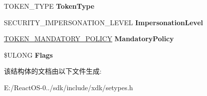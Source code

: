\begin{DoxyCompactItemize}
T\+O\+K\+E\+N\+\_\+\+T\+Y\+PE {\bfseries Token\+Type}
\item 
\mbox{\label{struct___t_o_k_e_n___a_c_c_e_s_s___i_n_f_o_r_m_a_t_i_o_n_a9536f8b6211074617a35fc08c63d5390}} 
S\+E\+C\+U\+R\+I\+T\+Y\+\_\+\+I\+M\+P\+E\+R\+S\+O\+N\+A\+T\+I\+O\+N\+\_\+\+L\+E\+V\+EL {\bfseries Impersonation\+Level}
\item 
\mbox{\label{struct___t_o_k_e_n___a_c_c_e_s_s___i_n_f_o_r_m_a_t_i_o_n_affb4c746ae83a85f5f29cc34a5e4c863}} 
\hyperlink{struct___t_o_k_e_n___m_a_n_d_a_t_o_r_y___p_o_l_i_c_y}{T\+O\+K\+E\+N\+\_\+\+M\+A\+N\+D\+A\+T\+O\+R\+Y\+\_\+\+P\+O\+L\+I\+CY} {\bfseries Mandatory\+Policy}
\item 
\mbox{\label{struct___t_o_k_e_n___a_c_c_e_s_s___i_n_f_o_r_m_a_t_i_o_n_afa360343d00e1f8253b4ec6a386307fb}} 
\$U\+L\+O\+NG {\bfseries Flags}
\end{DoxyCompactItemize}


该结构体的文档由以下文件生成\+:\begin{DoxyCompactItemize}
\item 
E\+:/\+React\+O\+S-\/0../sdk/include/xdk/setypes.\+h\end{DoxyCompactItemize}
